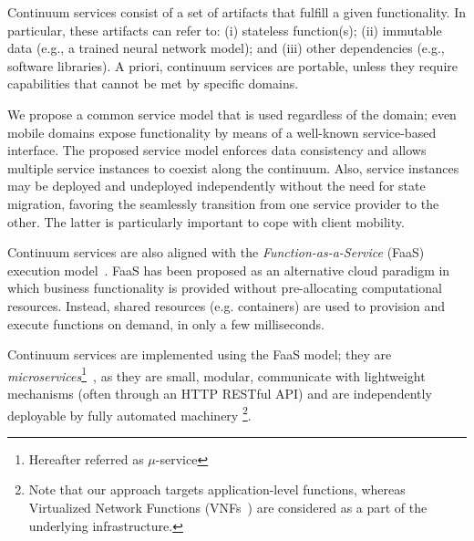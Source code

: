 Continuum services consist of a set of artifacts that fulfill a given functionality. In particular, these artifacts can refer to: (i) stateless function(s); (ii) immutable data (e.g., a trained neural network model); and (iii) other dependencies (e.g., software libraries). A priori, continuum services are portable, unless they require capabilities that cannot be met by specific domains. 

We propose a common service model that is used regardless of the domain; even mobile domains expose functionality by means of a well-known service-based interface. The proposed service model enforces data consistency and allows multiple service instances to coexist along the continuum. Also, service instances may be deployed and undeployed independently without the need for state migration, favoring the seamlessly transition from one service provider to the other. The latter is particularly important to cope with client mobility. 

Continuum services are also aligned with the \textit{Function-as-a-Service} (FaaS) execution model~\cite{MateosFaaster17}. FaaS has been proposed as an alternative cloud paradigm in which business functionality is provided without pre-allocating computational resources. Instead, shared resources (e.g. containers) are used to provision and execute functions on demand, in only a few milliseconds. 

Continuum services are implemented using the FaaS model; they are \textit{microservices}\footnote{Hereafter referred as $\mu$-service}~\cite{lewis2014microservices}, as they are small, modular, communicate with lightweight mechanisms (often through an HTTP RESTful API) and are independently deployable by fully automated machinery \footnote{Note that our approach targets application-level functions, whereas Virtualized Network Functions (VNFs~\cite{etsimec16}) are considered as a part of the underlying infrastructure.}.




